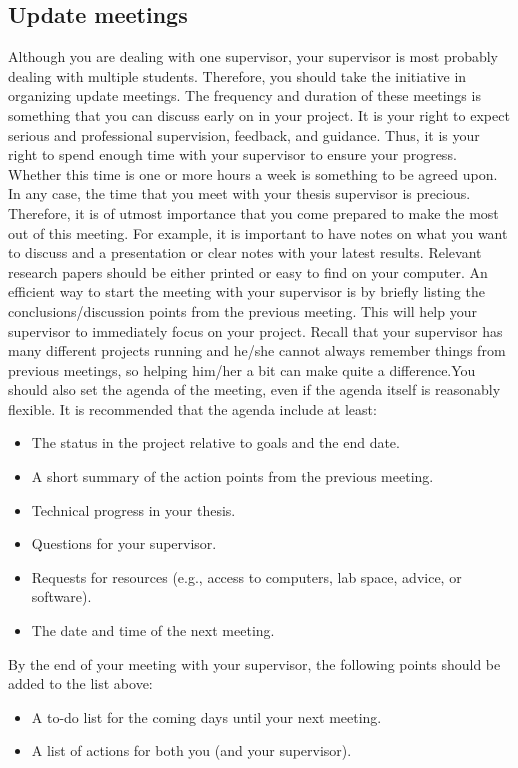 \documentclass{article}
\begin{document}
\subsection{Update meetings}
Although you are dealing with one supervisor, your supervisor is most probably dealing with multiple students. Therefore, you should take the initiative in organizing update meetings. The frequency and duration of these meetings is something that you can discuss early on in your project. It is your right to expect serious and professional supervision, feedback, and guidance. Thus, it is your right to spend enough time with your supervisor to ensure your progress. Whether this time is one or more hours a week is something to be agreed upon. In any case, the time that you meet with your thesis supervisor is precious. Therefore, it is of utmost importance that you come prepared to make the most out of this meeting. For example, it is important to have notes on what you want to discuss and a presentation or clear notes with your latest results. Relevant research papers should be either printed or easy to find on your computer. An efficient way to start the meeting with your supervisor is by briefly listing the conclusions/discussion points from the previous meeting. This will help your supervisor to immediately focus on your project. Recall that your supervisor has many different projects running and he/she cannot always remember things from previous meetings, so helping him/her a bit can make quite a difference.You should also set the agenda of the meeting, even if the agenda itself is reasonably flexible. It is recommended that the agenda include at least:
\begin{itemize}
    \item The status in the project relative to goals and the end date.
    \item A short summary of the action points from the previous meeting.
    \item	Technical progress in your thesis.
    \item	Questions for your supervisor.
    \item	Requests for resources (e.g., access to computers, lab space, advice, or software). 
    \item	The date and time of the next meeting.
\end{itemize}
By the end of your meeting with your supervisor, the following points should be added to the list above:
\begin{itemize}
    \item	A to-do list for the coming days until your next meeting.
    \item	A list of actions for both you (and your supervisor).
\end{itemize}
\end{document}
